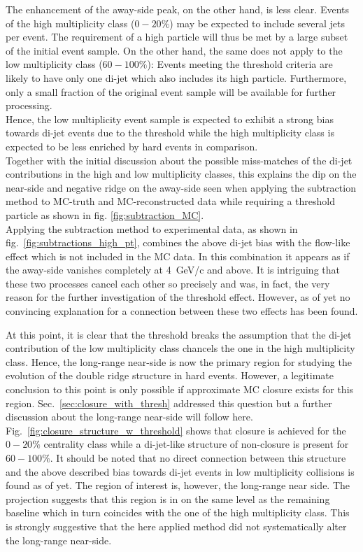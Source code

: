 The enhancement of the away-side peak, on the other hand, is less clear. Events of the high multiplicity class ($0-20\%$) may be expected to include several jets per event. The requirement of a high \pt particle will thus be met by a large subset of the initial event sample. On the other hand, the same does not apply to the low multiplicity class ($60-100\%$): Events meeting the threshold criteria are likely to have only one di-jet which also includes its high \pt particle. Furthermore, only a small fraction of the original event sample will be available for further processing.\\
Hence, the low multiplicity event sample is expected to exhibit a strong bias towards di-jet events due to the threshold while the high multiplicity class is expected to be less enriched by hard events in comparison.\\

Together with the initial discussion about the possible miss-matches of the di-jet contributions in the high and low multiplicity classes, this explains the dip on the near-side and negative ridge on the away-side seen when applying the subtraction method to MC-truth and MC-reconstructed data while requiring a threshold particle as shown in fig. \ref{fig:subtraction_MC}.\\

Applying the subtraction method to experimental data, as shown in fig.~\ref{fig:subtractions_high_pt}, combines the above di-jet bias with the flow-like effect which is not included in the MC data. In this combination it appears as if the away-side vanishes completely at \SI{4}{GeV/c} and above. It is intriguing that these two processes cancel each other so precisely and was, in fact, the very reason for the further investigation of the threshold effect. However, as of yet no convincing explanation for a connection between these two effects has been found.

At this point, it is clear that the threshold breaks the assumption that the di-jet contribution of the low multiplicity class chancels the one in the high multiplicity class. Hence, the long-range near-side is now the primary region for studying the evolution of the double ridge structure in hard events. However, a legitimate conclusion to this point is only possible if approximate MC closure exists for this region. Sec.~\ref{sec:closure_with_thresh} addressed this question but a further discussion about the long-range near-side will follow here. Fig.~\ref{fig:closure_structure_w_threshold} shows that closure is achieved for the $0-20\%$ centrality class while a di-jet-like structure of non-closure is present for $60-100\%$. It should be noted that no direct connection between this structure and the above described bias towards di-jet events in low multiplicity collisions is found as of yet. The region of interest is, however, the long-range near side. The \deta projection suggests that this region is in on the same level as the remaining baseline which in turn coincides with the one of the high multiplicity class. This is strongly suggestive that the here applied method did not systematically alter the long-range near-side.\\


